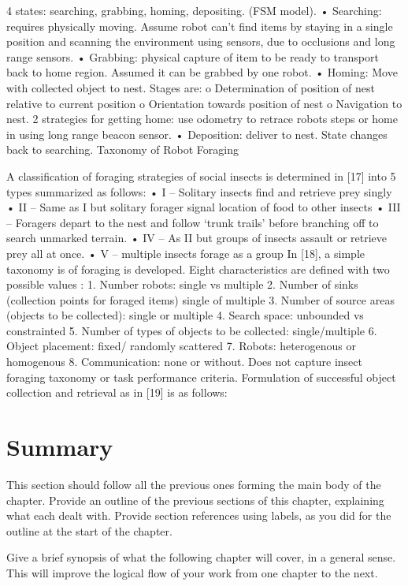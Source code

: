 4 states: searching, grabbing, homing, depositing. (FSM model).
•	Searching: requires physically moving. Assume robot can’t find items by staying in a single position and scanning the environment using sensors, due to occlusions and long range sensors.
•	Grabbing: physical capture of item to be ready to transport back to home region. Assumed it can be grabbed by one robot.
•	Homing: Move with collected object to nest. Stages are:
o	Determination of position of nest relative to current position
o	Orientation towards position of nest
o	Navigation to nest. 2 strategies for getting home: use odometry to retrace robots steps or home in using long range beacon sensor. 
•	Deposition: deliver to nest. State changes back to searching.
Taxonomy of Robot Foraging

A classification of foraging strategies of social insects is determined in [17] into 5 types summarized as follows:
•	I – Solitary insects find and retrieve prey singly
•	II – Same as I but solitary forager signal location of food to other insects
•	III – Foragers depart to the nest and follow ‘trunk trails’ before branching off to search unmarked terrain. 
•	IV – As II but groups of insects assault or retrieve prey all at once. 
•	V – multiple insects forage as a group
In [18], a simple taxonomy is of foraging is developed. Eight characteristics are defined with two possible values :
1.	Number robots: single vs multiple
2.	Number of sinks (collection points for foraged items) single of multiple
3.	Number of source areas (objects to be collected): single or multiple
4.	Search space: unbounded vs constrainted
5.	Number of types of objects to be collected: single/multiple
6.	Object placement: fixed/ randomly scattered
7.	Robots: heterogenous or homogenous
8.	Communication: none or without. 
Does not capture insect foraging taxonomy or task performance criteria. 
Formulation of successful object collection and retrieval as in [19] is as follows:



\section{Summary}
\label{sec:first:summary}

This section should follow all the previous ones forming the main body of the chapter. Provide an outline of the previous sections of this chapter, explaining what each dealt with. Provide section references using labels, as you did for the outline at the start of the chapter.

Give a brief synopsis of what the following chapter will cover, in a general sense. This will improve the logical flow of your work from one chapter to the next.

